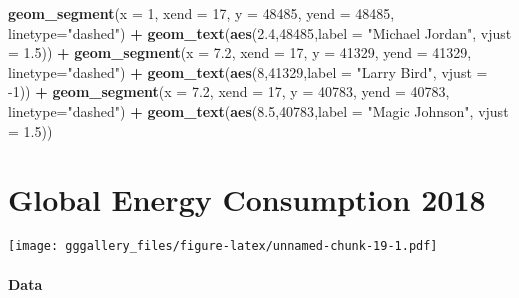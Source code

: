 \documentclass[]{book}
\newenvironment{Shaded}{\begin{snugshade}}{\end{snugshade}}
\newcommand{\DataTypeTok}[1]{\textcolor[rgb]{0.13,0.29,0.53}{#1}}
\newcommand{\DecValTok}[1]{\textcolor[rgb]{0.00,0.00,0.81}{#1}}
\newcommand{\FloatTok}[1]{\textcolor[rgb]{0.00,0.00,0.81}{#1}}
\newcommand{\KeywordTok}[1]{\textcolor[rgb]{0.13,0.29,0.53}{\textbf{#1}}}
\newcommand{\NormalTok}[1]{#1}
\newcommand{\OperatorTok}[1]{\textcolor[rgb]{0.81,0.36,0.00}{\textbf{#1}}}
\newcommand{\StringTok}[1]{\textcolor[rgb]{0.31,0.60,0.02}{#1}}
\begin{document}
\begin{Shaded}
\begin{Highlighting}[]
\StringTok{  }\KeywordTok{geom_segment}\NormalTok{(}\DataTypeTok{x =} \DecValTok{1}\NormalTok{, }\DataTypeTok{xend =} \DecValTok{17}\NormalTok{, }\DataTypeTok{y =} \DecValTok{48485}\NormalTok{, }\DataTypeTok{yend =} \DecValTok{48485}\NormalTok{, }\DataTypeTok{linetype=}\StringTok{"dashed"}\NormalTok{) }\OperatorTok{+}\StringTok{ }
\StringTok{  }\KeywordTok{geom_text}\NormalTok{(}\KeywordTok{aes}\NormalTok{(}\FloatTok{2.4}\NormalTok{,}\DecValTok{48485}\NormalTok{,}\DataTypeTok{label =} \StringTok{"Michael Jordan"}\NormalTok{, }\DataTypeTok{vjust =} \FloatTok{1.5}\NormalTok{)) }\OperatorTok{+}
\StringTok{  }\KeywordTok{geom_segment}\NormalTok{(}\DataTypeTok{x =} \FloatTok{7.2}\NormalTok{, }\DataTypeTok{xend =} \DecValTok{17}\NormalTok{, }\DataTypeTok{y =} \DecValTok{41329}\NormalTok{, }\DataTypeTok{yend =} \DecValTok{41329}\NormalTok{, }\DataTypeTok{linetype=}\StringTok{"dashed"}\NormalTok{) }\OperatorTok{+}\StringTok{ }
\StringTok{  }\KeywordTok{geom_text}\NormalTok{(}\KeywordTok{aes}\NormalTok{(}\DecValTok{8}\NormalTok{,}\DecValTok{41329}\NormalTok{,}\DataTypeTok{label =} \StringTok{"Larry Bird"}\NormalTok{, }\DataTypeTok{vjust =} \DecValTok{-1}\NormalTok{)) }\OperatorTok{+}
\StringTok{  }\KeywordTok{geom_segment}\NormalTok{(}\DataTypeTok{x =} \FloatTok{7.2}\NormalTok{, }\DataTypeTok{xend =} \DecValTok{17}\NormalTok{, }\DataTypeTok{y =} \DecValTok{40783}\NormalTok{, }\DataTypeTok{yend =} \DecValTok{40783}\NormalTok{, }\DataTypeTok{linetype=}\StringTok{"dashed"}\NormalTok{) }\OperatorTok{+}
\StringTok{  }\KeywordTok{geom_text}\NormalTok{(}\KeywordTok{aes}\NormalTok{(}\FloatTok{8.5}\NormalTok{,}\DecValTok{40783}\NormalTok{,}\DataTypeTok{label =} \StringTok{"Magic Johnson"}\NormalTok{, }\DataTypeTok{vjust =} \FloatTok{1.5}\NormalTok{)) }
\end{Highlighting}
\end{Shaded}

\hypertarget{energy18}{%
\chapter*{Global Energy Consumption 2018}\label{energy18}}

\texttt{[image: gggallery\_files/figure-latex/unnamed-chunk-19-1.pdf]}

\hypertarget{energy18data}{%
\subsubsection*{Data}\label{energy18data}}
\end{document}
